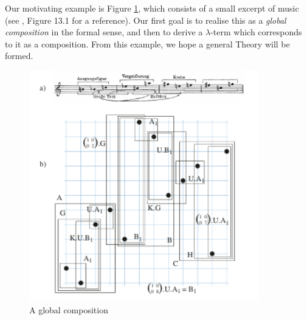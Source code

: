 Our motivating example is Figure \ref{Boulez}, which consists of a small excerpt of music (see \cite[\S 13.1]{Mazzola}, Figure 13.1 for a reference). Our first goal is to realise this as a \emph{global composition} in the formal sense, and then to derive a $\lambda$-term which corresponds to it as a composition. From this example, we hope a general Theory will be formed.
\begin{figure}[h]
 \centering
 \label{Boulez}
 \includegraphics[width = 10cm]{Pictures/Boulez.png}
 \caption{A global composition}
\end{figure}
